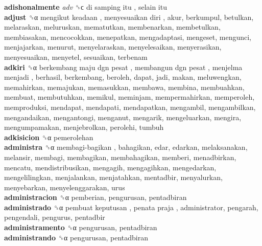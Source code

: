 \textbf{adishonalmente} \emph{adv}  ␝ϲ   di samping itu ,  selain itu   \\
\textbf{adjust} ␝α   mengikut keadaan ,  menyesuaikan diri , akur, berkumpul, betulkan, melaraskan, meluruskan, mematutkan, membenarkan, membetulkan, membiasakan, mencocokkan, menepatkan, mengadaptasi, mengeset, mengunci, menjajarkan, menurut, menyelaraskan, menyelesaikan, menyerasikan, menyesuaikan, menyetel, sesuaikan, terbenam  \\
\textbf{adkiri} ␝α   berkembang maju dgn pesat ,  membangun dgn pesat ,  menjelma menjadi , berhasil, berkembang, beroleh, dapat, jadi, makan, meluwengkan, memahirkan, memajukan, memasukkan, membawa, membina, membuahkan, membuat, membutuhkan, memikul, meminjam, mempermahirkan, memperoleh, memproduksi, mendapat, mendapati, mendapatkan, mengambil, mengambilkan, mengandaikan, mengantongi, menganut, mengarik, mengeluarkan, mengira, mengumpamakan, menjebrolkan, perolehi, tumbuh  \\
\textbf{adkisicion} ␝α  pemerolehan  \\
\textbf{administra} ␝α   membagi-bagikan , bahagikan, edar, edarkan, melaksanakan, melansir, membagi, membagikan, membahagikan, memberi, menadbirkan, mencatu, mendistribusikan, mengagih, mengagihkan, mengedarkan, mengelilingkan, menjalankan, menjatahkan, mentadbir, menyalurkan, menyebarkan, menyelenggarakan, urus  \\
\textbf{administracion} ␝α  pemberian, pengurusan, pentadbiran  \\
\textbf{administrado} ␝α   pembuat keputusan ,  penata praja , administrator, pengarah, pengendali, pengurus, pentadbir  \\
\textbf{administramento} ␝α  pengurusan, pentadbiran  \\
\textbf{administrando} ␝α  pengurusan, pentadbiran  \\
